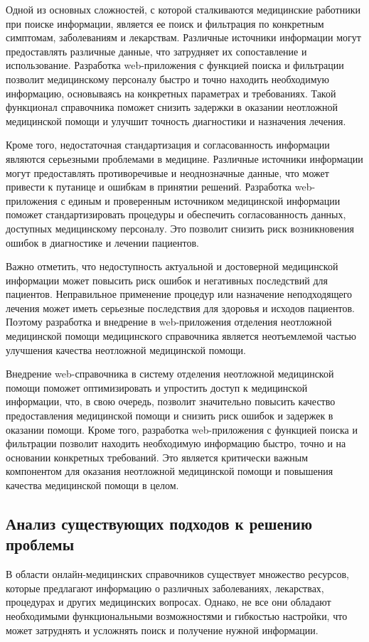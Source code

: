 Одной из основных сложностей, с которой сталкиваются медицинские работники при поиске информации, является ее поиск и фильтрация по конкретным симптомам, заболеваниям и лекарствам. Различные источники информации могут предоставлять различные данные, что затрудняет их сопоставление и использование. Разработка web-приложения с функцией поиска и фильтрации позволит медицинскому персоналу быстро и точно находить необходимую информацию, основываясь на конкретных параметрах и требованиях. Такой функционал справочника поможет снизить задержки в оказании неотложной медицинской помощи и улучшит точность диагностики и назначения лечения.

Кроме того, недостаточная стандартизация и согласованность информации являются серьезными проблемами в медицине. Различные источники информации могут предоставлять противоречивые и неоднозначные данные, что может привести к путанице и ошибкам в принятии решений. Разработка web-приложения с единым и проверенным источником медицинской информации поможет стандартизировать процедуры и обеспечить согласованность данных, доступных медицинскому персоналу. Это позволит снизить риск возникновения ошибок в диагностике и лечении пациентов.

Важно отметить, что недоступность актуальной и достоверной медицинской информации может повысить риск ошибок и негативных последствий для пациентов. Неправильное применение процедур или назначение неподходящего лечения может иметь серьезные последствия для здоровья и исходов пациентов. Поэтому разработка и внедрение в web-приложения отделения неотложной медицинской помощи медицинского справочника является неотъемлемой частью улучшения качества неотложной медицинской помощи.

Внедрение web-справочника в систему отделения неотложной медицинской помощи поможет оптимизировать и упростить доступ к медицинской информации, что, в свою очередь, позволит значительно повысить качество предоставления медицинской помощи и снизить риск ошибок и задержек в оказании помощи. Кроме того, разработка web-приложения с функцией поиска и фильтрации позволит находить необходимую информацию быстро, точно и на основании конкретных требований. Это является критически важным компонентом для оказания неотложной медицинской помощи и повышения качества медицинской помощи в целом.

\subsection{Анализ существующих подходов к решению проблемы}
В области онлайн-медицинских справочников существует множество ресурсов, которые предлагают информацию о различных заболеваниях, лекарствах, процедурах и других медицинских вопросах. Однако, не все они обладают необходимыми функциональными возможностями и гибкостью настройки, что может затруднять и усложнять поиск и получение нужной информации.

